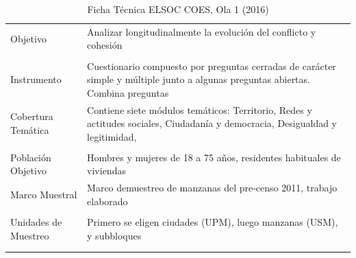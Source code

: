 \documentclass[
]{book}
\begin{document}
\begin{table}

\caption{\label{tab:unnamed-chunk-3}\label{tab:ficha}Ficha Técnica ELSOC COES, Ola 1 (2016)}
\centering
\begin{tabular}[t]{>{\raggedright\arraybackslash}p{5cm}>{\raggedright\arraybackslash}p{15cm}}
\toprule
\cellcolor{white}{Características} & \cellcolor{white}{ELSOC\_2016}\\
\midrule
Objetivo & Analizar longitudinalmente la evolución del conflicto y cohesión
\cellcolor{white}{                              en la sociedad chilena.}\\
\cellcolor{white}{Diseño} & \cellcolor{white}{Estudio cuantitativo por medio de un cuestionario estructurado.}\\
Instrumento & Cuestionario compuesto por preguntas cerradas de carácter simple
            y múltiple junto a algunas preguntas abiertas. Combina preguntas
\cellcolor{white}{            permanentes (todas las olas) e intercaladas.}\\
Cobertura Temática & Contiene siete módulos temáticos: Territorio, Redes y actitudes
          sociales, Ciudadanía y democracia, Desigualdad y legitimidad,
\cellcolor{white}{          Conflicto social, Salud y bienestar y Caracterización sociodemográfica.}\\
\cellcolor{white}{Unidad de Análisis} & \cellcolor{white}{Individuos.}\\
\addlinespace
Población Objetivo & Hombres y mujeres de 18 a 75 años, residentes habituales de viviendas
\cellcolor{white}{              particulares ocupadas, localizadas en 40 ciudades (92 comunas) del país.}\\
Marco Muestral & Marco demuestreo de manzanas del pre-censo 2011, trabajo elaborado
\cellcolor{white}{            por el Centro de Inteligencia Territorial (CIT) de la Universidad Adolfo Ibáñez.}\\
\cellcolor{white}{Diseño Muestral} & \cellcolor{white}{Probabilístico, estratificado, por conglomerados y multietápico.}\\
Unidades de Muestreo & Primero se eligen ciudades (UPM), luego manzanas (USM), y subbloques
\cellcolor{white}{              y viviendas (UTM). La unidad final de selección es la persona.}\\
\cellcolor{white}{Período de Aplicación} & \cellcolor{white}{Agosto a Diciembre de 2016 (20 semanas corridas).}\\
\addlinespace
\cellcolor{white}{Periodicidad} & \cellcolor{white}{Anual.Muestra de refresco al 3er año.}\\

\end{tabular}
\end{table}
\end{document}
